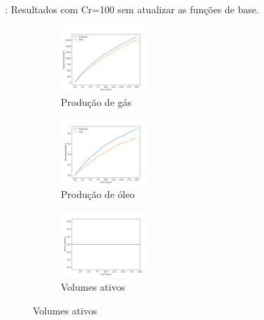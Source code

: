 \documentclass[professionalfont]{beamer}
\begin{document}
\begin{frame}{\FrameProblemName: {\small Resultados com Cr=100 sem atualizar as funções de base.}}
    \begin{figure}[!ht]
        \centering
        \begin{subfigure}{.48\textwidth}
            \centering
            \includegraphics[height=2.5cm]{./imgs/pr3/cr100/no_update/svgtopng/gas_prod.png}
            \caption{Produção de gás}
        \end{subfigure}
        \hfill
        \begin{subfigure}{.48\textwidth}
            \centering
            \includegraphics[height=2.5cm]{./imgs/pr3/cr100/no_update/svgtopng/oil_prod.png}
            \caption{Produção de óleo}
        \end{subfigure}
        \bigskip
        \begin{subfigure}{\textwidth}
            \centering
            \includegraphics[height=2.5cm]{./imgs/pr3/cr100/no_update/svgtopng/volumes_ativos.png}
            \caption{Volumes ativos}
        \end{subfigure}
        \label{fig:fig7_pr3-cr100}
        
    \end{figure}
\end{frame}
\end{document}
